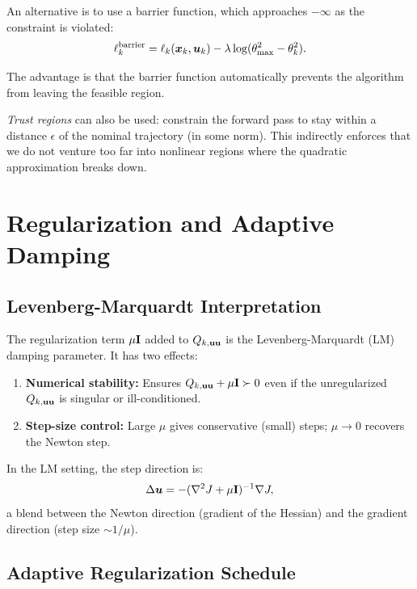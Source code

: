 An alternative is to use a barrier function, which approaches $-\infty$ as the constraint is violated:
\begin{equation}
\ell_k^{\text{barrier}} = \ell_k(\bm{x}_k,\bm{u}_k) - \lambda \log(\theta_{\max}^2 - \theta_k^2).
\label{eq:ch5:barrier-cost}
\end{equation}

The advantage is that the barrier function automatically prevents the algorithm from leaving the feasible region.

\emph{Trust regions} can also be used: constrain the forward pass to stay within a distance $\epsilon$ of the
nominal trajectory (in some norm). This indirectly enforces that we do not venture too far into nonlinear regions
where the quadratic approximation breaks down.

\section{Regularization and Adaptive Damping}

\subsection{Levenberg-Marquardt Interpretation}

The regularization term $\mu\mathbf{I}$ added to $Q_{k,\mathbf{u}\mathbf{u}}$ is the Levenberg-Marquardt (LM) damping parameter.
It has two effects:
\begin{enumerate}
\item \textbf{Numerical stability:} Ensures $Q_{k,\mathbf{u}\mathbf{u}} + \mu\mathbf{I} \succ 0$ even if the unregularized $Q_{k,\mathbf{u}\mathbf{u}}$
      is singular or ill-conditioned.
\item \textbf{Step-size control:} Large $\mu$ gives conservative (small) steps; $\mu \to 0$ recovers the Newton step.
\end{enumerate}

In the LM setting, the step direction is:
\begin{equation}
\Delta\bm{u} = -(\nabla^2 J + \mu\mathbf{I})^{-1}\nabla J,
\label{eq:ch5:lm-step}
\end{equation}
a blend between the Newton direction (gradient of the Hessian) and the gradient direction (step size $\sim 1/\mu$).

\subsection{Adaptive Regularization Schedule}

